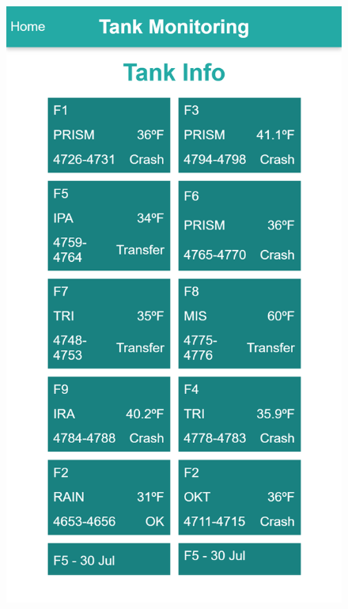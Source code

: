 \begin{figure}[H]
\begin{multicols}{3}
            \includegraphics[width=\linewidth]{./img/mobile-tank-info-page.png}\par
        \end{multicols}
            
    \end{figure}